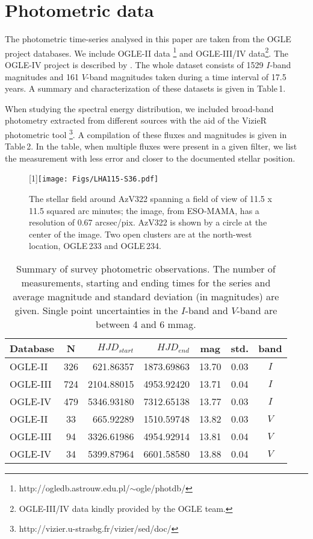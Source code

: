 \documentclass[useAMS,usenatbib]{mn2e}
\begin{document}
\section{Photometric data}

The photometric time-series analysed in this paper are taken from the OGLE project databases.
We include OGLE-II data \citep{2005AcA....55...43S}\footnote{http://ogledb.astrouw.edu.pl/$\sim$ogle/photdb/} and OGLE-III/IV data\footnote{ 
OGLE-III/IV data kindly provided by the OGLE team.}. The OGLE-IV project is described by \citet{2015AcA....65....1U}.
The whole dataset  consists of  1529 $I$-band magnitudes and 161 $V$-band magnitudes taken during a time interval of 17.5 years.
A summary and characterization of these datasets is given in Table\,1.

When studying the spectral energy distribution,  we included broad-band photometry extracted from different sources with the aid of the VizieR photometric tool \footnote{http://vizier.u-strasbg.fr/vizier/sed/doc/}. 
A compilation of these fluxes and magnitudes is given in Table\,2. In the table, when  multiple fluxes were present in a given filter, we list
the measurement with less error and closer to the documented stellar position.

\begin{figure}
\scalebox{1}[1]{\texttt{[image: Figs/LHA115-S36.pdf]}}
\caption{The stellar field around AzV322 spanning 
a field of view of 11.5 x 11.5  squared arc minutes; the image, from ESO-MAMA, has a resolution of 0.67 arcsec/pix. 
AzV322 is shown by a circle at the center of the image.  
Two open clusters are at the north-west location, OGLE\,233 and OGLE\,234.
}
  \label{x}
\end{figure}


\begin{table}
\centering
 \caption{Summary of survey photometric observations. The number of measurements, starting and ending times for the series and average magnitude and standard deviation (in magnitudes) are given.
 Single point uncertainties in the $I$-band and $V$-band are between 4 and 6 mmag.}
 \begin{tabular}{@{}lcrrccc@{}}
 \hline
Database &N &$HJD_{start}$ &$HJD_{end}$&mag &std. &band \\
\hline
OGLE-II  &326& 621.86357 &1873.69863&13.70 &0.03 &$I$\\
OGLE-III &      724& 2104.88015& 4953.92420&13.71 &0.04 &$I$\\
OGLE-IV  & 479& 5346.93180 &7312.65138 &13.77 &0.03 &$I$\\
OGLE-II &   33& 665.92289 &1510.59748 &13.82 &0.03 &$V$\\
OGLE-III  & 94& 3326.61986 &4954.92914 &13.81& 0.04 &$V$\\
OGLE-IV  & 34 &5399.87964 &6601.58580 &13.88 &0.04& $V$\\
 \hline
\end{tabular}
\end{table}
\end{document}
